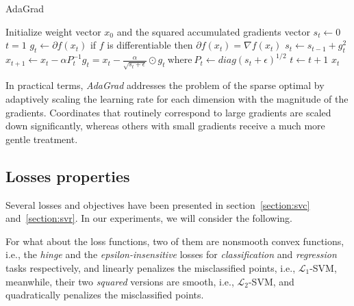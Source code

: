 \begin{algorithm}[H]
	\caption{AdaGrad}
	\label{alg:adagrad}
	\begin{algorithmic}
			\State Initialize weight vector $x_0$ and the squared accumulated gradients vector $s_t \gets 0$
			\State $t = 1$
				\State $g_t \gets \partial f(x_t)$ \Comment if $f$ is differentiable then $\partial f(x_t) = \nabla f(x_t)$
				\State $s_t \gets s_{t-1} + g_t^2$
				\State $x_{t+1} \gets x_t - \alpha P_t^{-1} g_t = x_t - \displaystyle \frac{\alpha}{\sqrt{s_t + \epsilon}} \odot g_t \ \text{where} \ P_t \gets diag(s_t + \epsilon)^{1/2}$
				\State $t \gets t + 1$
			\EndWhile
			\State \Return $x_t$
		\EndFunction
	\end{algorithmic}
\end{algorithm}

In practical terms, \emph{AdaGrad} addresses the problem of the sparse optimal by adaptively scaling the learning rate for each dimension with the magnitude of the gradients. Coordinates that routinely correspond to large gradients are scaled down significantly, whereas others with small gradients receive a much more gentle treatment.

\pagebreak

\subsection{Losses properties}

Several losses and objectives have been presented in section~\ref{section:svc} and~\ref{section:svr}. In our experiments, we will consider the following.

For what about the loss functions, two of them are nonsmooth convex functions, i.e., the \emph{hinge} and the \emph{epsilon-insensitive} losses for \emph{classification} and \emph{regression} tasks respectively, and linearly penalizes the misclassified points, i.e., $\mathcal{L}_1$-SVM, meanwhile, their two \emph{squared} versions are smooth, i.e., $\mathcal{L}_2$-SVM, and quadratically penalizes the misclassified points.



